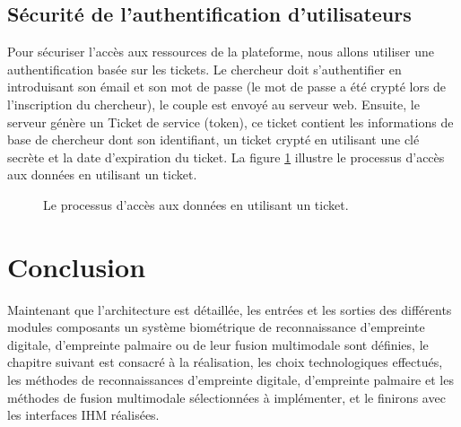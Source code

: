 \subsection{Sécurité de l'authentification d'utilisateurs}
Pour sécuriser l'accès aux ressources de la plateforme, nous allons utiliser une authentification basée sur les tickets. Le chercheur doit s'authentifier en introduisant son émail et son mot de passe (le mot de passe a été crypté lors de l'inscription du chercheur), le couple est envoyé au serveur web. Ensuite, le serveur génère un Ticket de service (token), ce ticket contient les informations de base de chercheur dont son identifiant, un ticket crypté en utilisant une clé secrète et la date d'expiration du ticket. 
La figure \ref{fig:servicessl} illustre le processus d'accès aux données
en utilisant un ticket.
\begin{figure}[H]
	\centering
	\caption{Le processus d'accès aux données
		en utilisant un ticket.	\label{fig:servicessl}}

\end{figure}
\section{Conclusion}
Maintenant que l’architecture est détaillée, les entrées et les sorties des différents modules composants un système biométrique de reconnaissance d’empreinte digitale, d’empreinte palmaire ou de leur fusion multimodale sont définies, le chapitre suivant est consacré à la réalisation, les choix technologiques effectués, les méthodes de reconnaissances d’empreinte digitale, d’empreinte palmaire et les méthodes de fusion multimodale sélectionnées à implémenter, et le finirons avec les interfaces IHM réalisées.
